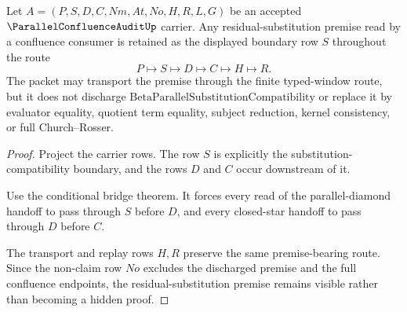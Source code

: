 \begin{theorem}
\label{thm:parallel-confluence-audit-residual-premise-retention}
Let $A=(P,S,D,C,Nm,At,No,H,R,L,G)$ be an accepted $\ParallelConfluenceAuditUp$ carrier. Any residual-substitution premise read by a confluence consumer is retained as the displayed boundary row $S$ throughout the route
$$
P \longmapsto S \longmapsto D \longmapsto C \longmapsto H \longmapsto R .
$$
The packet may transport the premise through the finite typed-window route, but it does not discharge $\mathrm{BetaParallelSubstitutionCompatibility}$ or replace it by evaluator equality, quotient term equality, subject reduction, kernel consistency, or full Church--Rosser.
\end{theorem}
\begin{proof}
Project the carrier rows. The row $S$ is explicitly the substitution-compatibility boundary, and the rows $D$ and $C$ occur downstream of it.

Use the conditional bridge theorem. It forces every read of the parallel-diamond handoff to pass through $S$ before $D$, and every closed-star handoff to pass through $D$ before $C$.

The transport and replay rows $H,R$ preserve the same premise-bearing route. Since the non-claim row $No$ excludes the discharged premise and the full confluence endpoints, the residual-substitution premise remains visible rather than becoming a hidden proof.
\end{proof}

